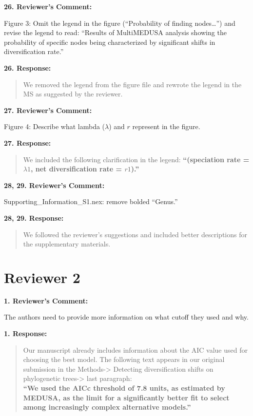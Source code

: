 \documentclass[]{article}
\begin{document}
\textbf{26. Reviewer's Comment:}

Figure 3: Omit the legend in the figure (``Probability of finding
nodes\ldots{}'') and revise the legend to read: ``Results of MultiMEDUSA
analysis showing the probability of specific nodes being characterized
by significant shifts in diversification rate.''

\textbf{26. Response:}

\begin{quote}
\color{blue}
We removed the legend from the figure file and rewrote the legend in the
MS as suggested by the reviewer.
\end{quote}

\textbf{27. Reviewer's Comment:}

Figure 4: Describe what lambda (\(\lambda\)) and \(r\) represent in the
figure.

\textbf{27. Response:}

\begin{quote}
\color{blue}
We included the following clarification in the legend:
\textbf{``(speciation rate = \(\lambda1\), net diversification rate =
\(r1\)).''}
\end{quote}

\textbf{28, 29. Reviewer's Comment:}

Supporting\_Information\_S1.nex: remove bolded ``Genus.''

\textbf{28, 29. Response:}

\begin{quote}
\color{blue}
We followed the reviewer's suggestions and included better descriptions
for the supplementary materials.
\end{quote}

\section{Reviewer 2}\label{reviewer-2}

\textbf{1. Reviewer's Comment:}

The authors need to provide more information on what cutoff they used
and why.

\textbf{1. Response:}

\begin{quote}
\color{blue}
Our manuscript already includes information about the AIC value used for
choosing the best model. The following text appears in our original
submission in the Methods-\textgreater{} Detecting diversification
shifts on phylogenetic trees-\textgreater{} last
paragraph:\\\textbf{``We used the AICc threshold of 7.8 units, as
estimated by MEDUSA, as the limit for a significantly better fit to
select among increasingly complex alternative models.''}
\end{quote}
\end{document}
